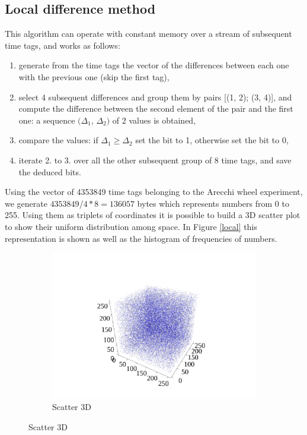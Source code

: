 \documentclass[10pt, final]{article}
\begin{document}
\begin{multicols}{2}
\subsection*{Local difference method}
This algorithm can operate with constant memory over a stream of subsequent time tags, and works as follows:
\begin{enumerate}
    \item generate from the time tags the vector of the differences between each one with the previous one (skip the first tag), 
    \item select 4 subsequent differences and group them by pairs [(1, 2); (3, 4)], and compute the difference between the second element of the pair and the first one: a sequence $(\Delta_1$, $\Delta_2)$ of 2 values is obtained,
    \item compare the values: if $\Delta_1 \geq \Delta_2$ set the bit to 1, otherwise set the bit to 0, 
    \item iterate 2. to 3. over all the other subsequent group of 8 time tags, and save the deduced bits.
\end{enumerate}
Using the vector of 4353849 time tags belonging to the Arecchi wheel experiment, we generate $4353849/4*8 = 136057$ bytes which represents numbers from 0 to 255. Using them as triplets of coordinates it is possible to build a 3D scatter plot to show their uniform distribution among space. In Figure \ref{local} this representation is shown as well as the histogram of frequencies of numbers.
\begin{mdframed}
    \begin{figure}[H]
        \begin{subfigure}{\textwidth}
            \centering
            \includegraphics[width = \textwidth]{../random_img/d2-scatter3d.pdf}
            \caption{Scatter 3D}
        \end{subfigure}


\end{figure}
\end{mdframed}
\end{multicols}
\end{document}
